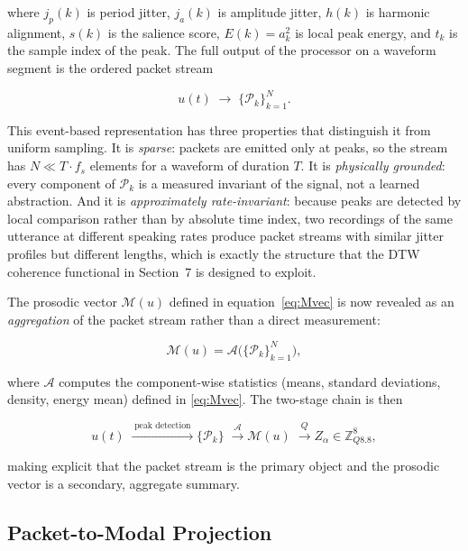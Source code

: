 \documentclass[12pt, a4paper]{article}
\begin{document}
where $j_p(k)$ is period jitter, $j_a(k)$ is amplitude jitter, $h(k)$ is harmonic alignment, $s(k)$ is the salience score, $E(k) = a_k^2$ is local peak energy, and $t_k$ is the sample index of the peak. The full output of the processor on a waveform segment is the ordered packet stream

\begin{equation}
u(t) \;\longrightarrow\; \{\mathcal{P}_k\}_{k=1}^N.
\label{eq:stream}
\end{equation}

This event-based representation has three properties that distinguish it from uniform sampling. It is \emph{sparse}: packets are emitted only at peaks, so the stream has $N \ll T \cdot f_s$ elements for a waveform of duration $T$. It is \emph{physically grounded}: every component of $\mathcal{P}_k$ is a measured invariant of the signal, not a learned abstraction. And it is \emph{approximately rate-invariant}: because peaks are detected by local comparison rather than by absolute time index, two recordings of the same utterance at different speaking rates produce packet streams with similar jitter profiles but different lengths, which is exactly the structure that the DTW coherence functional in Section~7 is designed to exploit.

The prosodic vector $\mathcal{M}(u)$ defined in equation~\eqref{eq:Mvec} is now revealed as an \emph{aggregation} of the packet stream rather than a direct measurement:

\begin{equation}
\mathcal{M}(u) = \mathcal{A}\bigl(\{\mathcal{P}_k\}_{k=1}^N\bigr),
\label{eq:agg}
\end{equation}

where $\mathcal{A}$ computes the component-wise statistics (means, standard deviations, density, energy mean) defined in \eqref{eq:Mvec}. The two-stage chain is then

\begin{equation}
u(t)
\;\xrightarrow{\;\text{peak detection}\;}
\{\mathcal{P}_k\}
\;\xrightarrow{\;\mathcal{A}\;}
\mathcal{M}(u)
\;\xrightarrow{\;Q\;}
Z_\alpha \in \mathbb{Z}_{Q8.8}^8,
\label{eq:fullchain}
\end{equation}

making explicit that the packet stream is the primary object and the prosodic vector is a secondary, aggregate summary.

\subsection{Packet-to-Modal Projection}
\end{document}
